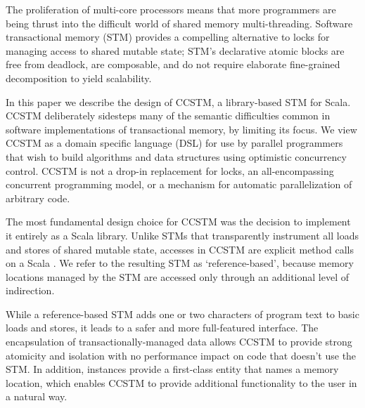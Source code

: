 The proliferation of multi-core processors means that more programmers are
being thrust into the difficult world of shared memory multi-threading.
Software transactional memory (STM) provides a compelling alternative to
locks for managing access to shared mutable state; STM's declarative
atomic blocks are free from deadlock, are composable, and do not
require elaborate fine-grained decomposition to yield scalability.


In this paper we describe the design of CCSTM, a library-based STM
for Scala.  CCSTM deliberately sidesteps many of the 
semantic difficulties common in software implementations of transactional
memory, by limiting its focus.  We view CCSTM as a domain specific language
(DSL)
for use by parallel programmers that wish to build algorithms and data
structures using optimistic concurrency control.  CCSTM is not a drop-in replacement for
locks, an all-encompassing concurrent programming model, or a mechanism
for automatic parallelization of arbitrary code.

The most fundamental design choice for CCSTM was the decision to implement
it entirely as a Scala library.  Unlike STMs that transparently instrument
all loads and stores of shared mutable state, accesses in CCSTM are
explicit method calls on a Scala  .  We refer to
the resulting STM as `reference-based', because memory locations managed
by the STM are accessed only through an additional level of indirection.

While a reference-based STM adds one or two characters of program text
to basic loads and stores, it leads to a safer and more full-featured
interface.  The encapsulation of transactionally-managed data allows CCSTM
to provide strong atomicity and isolation with no performance impact on
code that doesn't use the STM.  In addition,  instances provide
a first-class entity that names a memory location, which enables CCSTM
to provide additional functionality to the user in a natural way.

